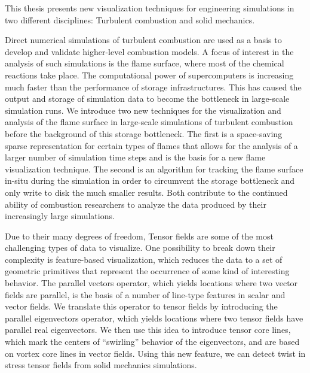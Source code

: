 %
%
This thesis presents new visualization techniques for engineering simulations in
two different disciplines: Turbulent combustion and solid mechanics.
%

%
Direct numerical simulations of turbulent combustion are used as a basis to
develop and validate higher-level combustion models.
%
A focus of interest in the analysis of such simulations is the flame surface,
where most of the chemical reactions take place.
%
The computational power of supercomputers is increasing much faster than the
performance of storage infrastructures.
%
This has caused the output and storage of simulation data to become the
bottleneck in large-scale simulation runs.
%
We introduce two new techniques for the visualization and analysis of the flame
surface in large-scale simulations of turbulent combustion before the background
of this storage bottleneck.
%
The first is a space-saving sparse representation for certain types of flames
that allows for the analysis of a larger number of simulation time steps and is
the basis for a new flame visualization technique.
%
The second is an algorithm for tracking the flame surface in-situ during the
simulation in order to circumvent the storage bottleneck and only write to disk
the much smaller results.
%
Both contribute to the continued ability of combustion researchers to analyze
the data produced by their increasingly large simulations.
%

%
Due to their many degrees of freedom, Tensor fields are some of the most
challenging types of data to visualize.
%
One possibility to break down their complexity is feature-based visualization,
which reduces the data to a set of geometric primitives that represent the
occurrence of some kind of interesting behavior.
%
The parallel vectors operator, which yields locations where two vector fields
are parallel, is the basis of a number of line-type features in scalar and
vector fields.
%
We translate this operator to tensor fields by introducing the parallel
eigenvectors operator, which yields locations where two tensor fields have
parallel real eigenvectors.
%
We then use this idea to introduce tensor core lines, which mark the centers of
``swirling'' behavior of the eigenvectors, and are based on vortex core lines in
vector fields.
%
Using this new feature, we can detect twist in stress tensor fields from solid
mechanics simulations.
%